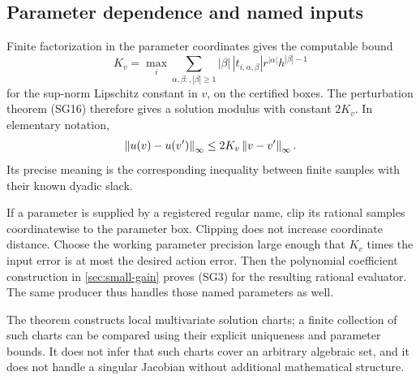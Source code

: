 \subsection{Parameter dependence and named inputs}

Finite factorization in the parameter coordinates gives the computable
bound
\[
 K_v=\max_i\sum_{\alpha,\beta:,|\beta|\ge1}
   |\beta|\,|t_{i,\alpha,\beta}|
              r^{|\alpha|}h^{|\beta|-1}
\]
for the sup-norm Lipschitz constant in \(v\), on the certified
boxes. The perturbation theorem (SG16) therefore gives a solution
modulus with constant \(2K_v\). In elementary notation,
\[
 \left\lVert u(v)-u(v')\right\rVert_\infty\le2K_v\left\lVert v-v'\right\rVert_\infty.
\]
Its precise meaning is the corresponding inequality between
finite samples with their known dyadic slack.

If a parameter is supplied by a registered regular name, clip its
rational samples coordinatewise to the parameter box. Clipping
does not increase coordinate distance. Choose the working
parameter precision large enough that \(K_v\) times the input
error is at most the desired action error. Then the polynomial
coefficient construction in \cref{sec:small-gain} proves (SG3)
for the resulting rational evaluator. The same producer thus
handles those named parameters as well.

The theorem constructs local multivariate solution charts; a finite
collection of such charts can be compared using their explicit
uniqueness and parameter bounds. It does not infer that such charts
cover an arbitrary algebraic set, and it does not handle a singular
Jacobian without additional mathematical structure.

